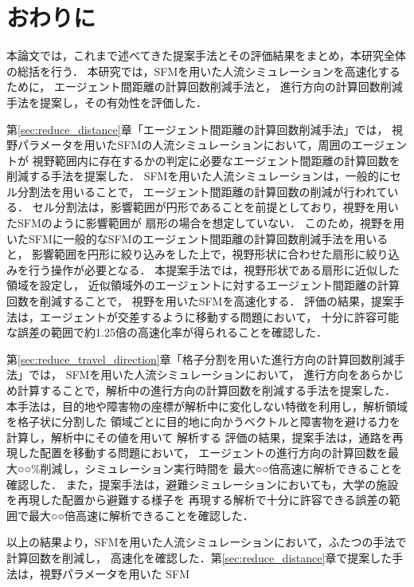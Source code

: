 \chapter{おわりに}
\label{sec:discuss}
本論文では，これまで述べてきた提案手法とその評価結果をまとめ，本研究全体の総括を行う．
本研究では，SFMを用いた人流シミュレーションを高速化するために，
エージェント間距離の計算回数削減手法と，
進行方向の計算回数削減手法を提案し，その有効性を評価した．

第\ref{sec:reduce_distance}章「エージェント間距離の計算回数削減手法」では，
視野パラメータを用いたSFMの人流シミュレーションにおいて，周囲のエージェントが
視野範囲内に存在するかの判定に必要なエージェント間距離の計算回数を削減する手法を提案した．
SFMを用いた人流シミュレーションは，一般的にセル分割法を用いることで，
エージェント間距離の計算回数の削減が行われている．
セル分割法は，影響範囲が円形であることを前提としており，視野を用いたSFMのように影響範囲が
扇形の場合を想定していない．
このため，視野を用いたSFMに一般的なSFMのエージェント間距離の計算回数削減手法を用いると，
影響範囲を円形に絞り込みをした上で，視野形状に合わせた扇形に絞り込みを行う操作が必要となる．
本提案手法では，視野形状である扇形に近似した領域を設定し，
近似領域外のエージェントに対するエージェント間距離の計算回数を削減することで，
視野を用いたSFMを高速化する．
評価の結果，提案手法は，エージェントが交差するように移動する問題において，
十分に許容可能な誤差の範囲で約1.25倍の高速化率が得られることを確認した．


第\ref{sec:reduce_travel_direction}章「格子分割を用いた進行方向の計算回数削減手法」では，
SFMを用いた人流シミュレーションにおいて，
進行方向をあらかじめ計算することで，解析中の進行方向の計算回数を削減する手法を提案した．
本手法は，目的地や障害物の座標が解析中に変化しない特徴を利用し，解析領域を格子状に分割した
領域ごとに目的地に向かうベクトルと障害物を避ける力を計算し，解析中にその値を用いて
解析する
評価の結果，提案手法は，通路を再現した配置を移動する問題において，
エージェントの進行方向の計算回数を最大○○\%削減し，シミュレーション実行時間を
最大○○倍高速に解析できることを確認した．
また，提案手法は，避難シミュレーションにおいても，大学の施設を再現した配置から避難する様子を
再現する解析で十分に許容できる誤差の範囲で最大○○倍高速に解析できることを確認した．

以上の結果より，SFMを用いた人流シミュレーションにおいて，ふたつの手法で計算回数を削減し，
高速化を確認した．第\ref{sec:reduce_distance}章で提案した手法は，視野パラメータを用いた
SFM

